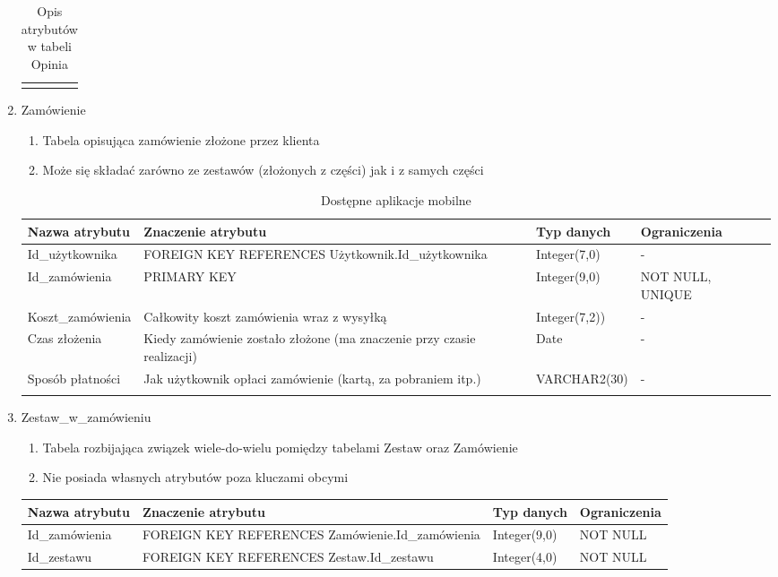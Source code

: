\begin{enumerate}
{\begin{longtable}{|p{3cm}|p{5cm}|p{2.5cm}|p{2.5cm}|}
  	\hline
	\caption{Opis atrybutów w tabeli Opinia}
	\end{longtable}}
  \item Zamówienie
  	\begin{enumerate}
  	  \item Tabela opisująca zamówienie złożone przez klienta
  	  \item Może się składać zarówno ze zestawów (złożonych z części) jak i z
  	  samych części
  	\end{enumerate}
  	{\footnotesize
  	\begin{longtable}{|p{3cm}|p{5cm}|p{2.5cm}|p{2.5cm}|}
  	\hline
  	\textbf{Nazwa atrybutu} & \textbf{Znaczenie atrybutu} & \textbf{Typ danych} &
  	\textbf{Ograniczenia} \\
  	\hline
  	Id\_użytkownika & FOREIGN KEY REFERENCES Użytkownik.Id\_użytkownika  &
  	Integer(7,0) & -
  	\\
  	\hline
  	Id\_zamówienia & PRIMARY KEY & Integer(9,0) & NOT NULL, UNIQUE  \\
  	\hline
  	Koszt\_zamówienia & Całkowity koszt zamówienia wraz z wysyłką & Integer(7,2))
  	& -
  	\\
  	\hline
  	Czas złożenia & Kiedy zamówienie zostało złożone (ma znaczenie przy czasie
  	realizacji) & Date & -
  	\\
 	\hline
  	Sposób płatności & Jak użytkownik opłaci zamówienie (kartą, za pobraniem
  	itp.) & VARCHAR2(30) & -
  	\\
  	\hline
	\caption{Dostępne aplikacje mobilne}
	\end{longtable}}
  \item Zestaw\_w\_zamówieniu
  	\begin{enumerate}
  	  \item Tabela rozbijająca związek wiele-do-wielu pomiędzy tabelami Zestaw
  	  oraz Zamówienie
  	  \item Nie posiada własnych atrybutów poza kluczami obcymi
  	\end{enumerate}
  	{\footnotesize
  	\begin{longtable}{|p{3cm}|p{5cm}|p{2.5cm}|p{2.5cm}|}
  	\hline
  	\textbf{Nazwa atrybutu} & \textbf{Znaczenie atrybutu} & \textbf{Typ danych} &
  	\textbf{Ograniczenia} \\
  	\hline
  	Id\_zamówienia & FOREIGN KEY REFERENCES Zamówienie.Id\_zamówienia  &
  	Integer(9,0) & NOT NULL
  	\\
  	\hline
  	Id\_zestawu & FOREIGN KEY REFERENCES Zestaw.Id\_zestawu & Integer(4,0) & NOT
  	NULL
  	\\

\end{longtable}}
\end{enumerate}
